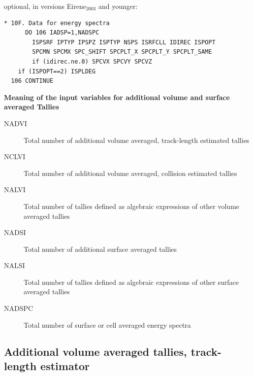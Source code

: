 optional, in versions Eirene$_{2003}$ and younger:

\begin{lstlisting}
* 10F. Data for energy spectra
      DO 106 IADSP=1,NADSPC
        ISPSRF IPTYP IPSPZ ISPTYP NSPS ISRFCLL IDIREC ISPOPT
        SPCMN SPCMX SPC_SHIFT SPCPLT_X SPCPLT_Y SPCPLT_SAME
        if (idirec.ne.0) SPCVX SPCVY SPCVZ
	if (ISPOPT==2) ISPLDEG
  106 CONTINUE
\end{lstlisting}

\textbf{Meaning of the input variables for additional volume and surface averaged Tallies}

\medskip

\begin{description}
  \item[NADVI] Total number of additional volume averaged,
        track-length estimated tallies
  \item[NCLVI] Total number of additional volume
        averaged, collision estimated tallies
  \item[NALVI] Total number of tallies
        defined as algebraic expressions of other volume averaged tallies
  \item[NADSI]
        Total number of additional surface averaged tallies
  \item[NALSI] Total number
        of tallies defined as algebraic expressions of other surface averaged tallies
  \item[NADSPC] Total number of surface or cell averaged energy spectra
\end{description}

\subsection{Additional volume averaged tallies, track-length estimator}\label{sec2.10A}

